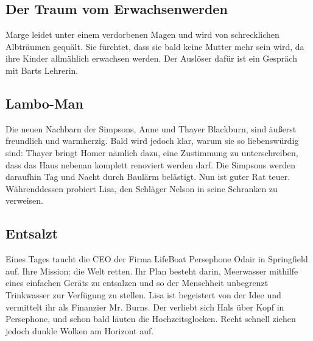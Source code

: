 
\subsection{Der Traum vom Erwachsenwerden}
Marge leidet unter einem verdorbenen Magen und wird von schrecklichen Albträumen gequält. Sie fürchtet, dass sie bald keine Mutter mehr sein wird, da ihre Kinder allmählich erwachsen werden. Der Auslöser dafür ist ein Gespräch mit Barts Lehrerin.


\subsection{Lambo-Man}\label{OABF20}
Die neuen Nachbarn der Simpsons, Anne und Thayer Blackburn, sind äußerst freundlich und warmherzig. Bald wird jedoch klar, warum sie so liebenswürdig sind: Thayer bringt Homer nämlich dazu, eine Zustimmung zu unterschreiben, dass das Haus nebenan komplett renoviert werden darf. Die Simpsons werden daraufhin Tag und Nacht durch Baulärm belästigt. Nun ist guter Rat teuer. Währenddessen probiert Lisa, den Schläger Nelson in seine Schranken zu verweisen.


\subsection{Entsalzt}\label{OABF21}
Eines Tages taucht die CEO der Firma LifeBoat Persephone Odair in Springfield auf. Ihre Mission: die Welt retten. Ihr Plan besteht darin, Meerwasser mithilfe eines einfachen Geräts zu entsalzen und so der Menschheit unbegrenzt Trinkwasser zur Verfügung zu stellen. Lisa ist begeistert von der Idee und vermittelt ihr als Finanzier Mr. Burns. Der verliebt sich Hals über Kopf in Persephone, und schon bald läuten die Hochzeitsglocken. Recht schnell ziehen jedoch dunkle Wolken am Horizont auf.


